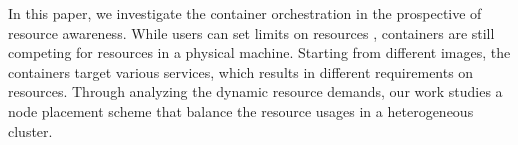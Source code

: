 In this paper, we investigate the container orchestration in the prospective of resource awareness. 
While users can set limits on resources \added{[how?]}, containers are still competing for resources in a physical machine.
Starting from different images, the containers target various services, which results in different requirements on resources.
Through analyzing the dynamic resource demands, our work studies a node placement scheme that balance the resource usages in a 
heterogeneous cluster. 



